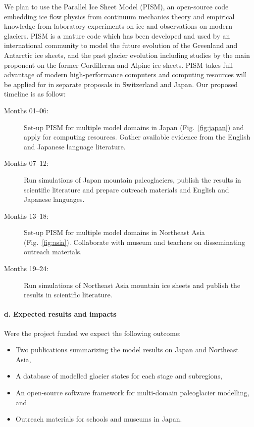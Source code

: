 \documentclass{article}
\begin{document}
    We plan to use the Parallel Ice Sheet Model (PISM), an open-source code
    embedding ice flow physics from continuum mechanics theory and empirical
    knowledge from laboratory experiments on ice and observations on modern
    glaciers. PISM is a mature code which has been developed and used by an
    international community to model the future evolution of the Greenland and
    Antarctic ice sheets, and the past glacier evolution including studies by
    the main proponent on the former Cordilleran and Alpine ice sheets. PISM
    takes full advantage of modern high-performance computers and computing
    resources will be applied for in separate proposals in Switzerland and
    Japan. Our proposed timeline is as follow:
    \begin{description}
      \item[Months 01--06:]
        Set-up PISM for multiple model domains in Japan (Fig.~\ref{fig:japan})
        and apply for computing resources. Gather available evidence from the
        English and Japanese language literature.
      \item[Months 07--12:]
        Run simulations of Japan mountain paleoglaciers, publish the results in
        scientific literature and prepare outreach materials and English and
        Japanese languages.
      \item[Months 13--18:]
        Set-up PISM for multiple model domains in Northeast Asia
        (Fig.~\ref{fig:asia}). Collaborate with museum and teachers on
        disseminating outreach materials.
      \item[Months 19--24:]
        Run simulations of Northeast Asia mountain ice sheets and publish the
        results in scientific literature.
    \end{description}


\paragraph{d. Expected results and impacts}

    Were the project funded we expect the following outcome:

    \begin{itemize}
      \item{Two publications summarizing the model results on Japan and
            Northeast Asia,}
      \item{A database of modelled glacier states for each stage and
            subregions,}
      \item{An open-source software framework for multi-domain paleoglacier
            modelling, and}
      \item{Outreach materials for schools and museums in Japan.}
    \end{itemize}
\end{document}
